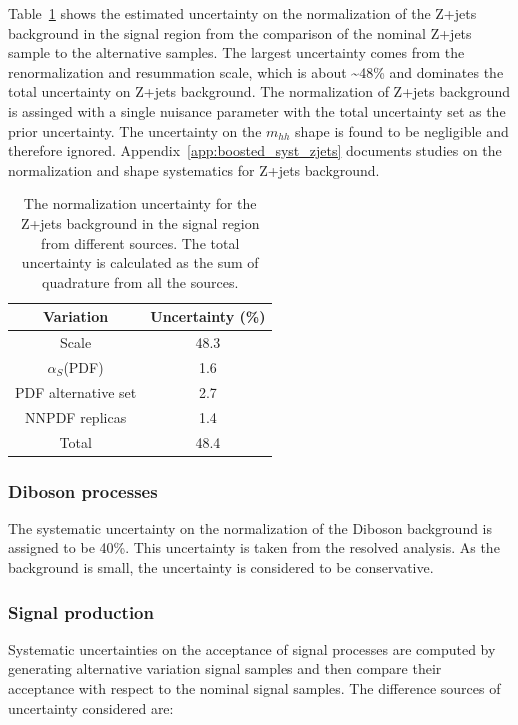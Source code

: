 Table~\ref{tab:boosted_unc_zjets} shows the estimated uncertainty on the normalization of the Z+jets background in the signal region
from the comparison of the nominal Z+jets sample to the alternative samples. The largest uncertainty comes from the renormalization
and resummation scale, which is about \textasciitilde48\% and dominates the total uncertainty on Z+jets background. The normalization of Z+jets
background is assinged with a single nuisance parameter with the total uncertainty set as the prior uncertainty. The uncertainty on the
$m_{hh}$ shape is found to be negligible and therefore ignored. Appendix~\ref{app:boosted_syst_zjets} documents studies on the normalization
and shape systematics for Z+jets background.
 
\begin{table}[htbp!]
\begin{center}
\begin{tabular}{c|c}
Variation  &  Uncertainty (\%) \\
\hline
Scale               &   48.3  \\
$\alpha_{S}$(PDF)   &   1.6   \\
PDF alternative set &   2.7   \\
NNPDF replicas      &   1.4   \\
\hline
Total               &   48.4  \\
\end{tabular}
\end{center}
\caption{The normalization uncertainty for the Z+jets background in the signal region
from different sources. The total uncertainty is calculated as the sum of quadrature from all
the sources.}
\label{tab:boosted_unc_zjets}
\end{table}
 
\FloatBarrier
\subsubsection{Diboson processes}
\label{sec:boosted_syst_modeling_diboson}
The systematic uncertainty on the normalization of the Diboson background is assigned to be 40\%. This uncertainty
is taken from the resolved analysis. As the background is small, the uncertainty is considered to be conservative.
 
\subsubsection{Signal production}
\label{sec:boosted_syst_modeling_signal}
Systematic uncertainties on the acceptance of signal processes are computed by generating alternative variation signal samples
and then compare their acceptance with respect to the nominal signal samples. The difference sources of uncertainty considered are:
 

